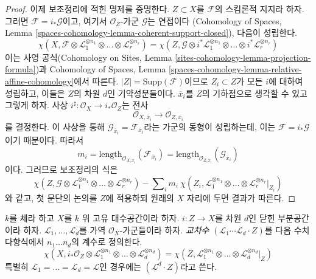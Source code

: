 \begin{proof}
\medskip\noindent
이제 보조정리에 적힌 명제를 증명한다.
$Z \subset X$를 $\mathcal{F}$의 스킴론적 지지라 하자. 그러면
$\mathcal{F} = i_*\mathcal{G}$이고, 여기서 $\mathcal{O}_Z$-가군
$\mathcal{G}$는 연접이다
(Cohomology of Spaces, Lemma
\ref{spaces-cohomology-lemma-coherent-support-closed}), 다음이 성립한다.
$$
\chi(X, \mathcal{F} \otimes
\mathcal{L}_1^{\otimes n_1} \otimes \ldots \otimes
\mathcal{L}_r^{\otimes n_r}) =
\chi(Z, \mathcal{G} \otimes
i^*\mathcal{L}_1^{\otimes n_1} \otimes \ldots \otimes
i^*\mathcal{L}_r^{\otimes n_r})
$$
이는 사영 공식(Cohomology on Sites, Lemma
\ref{sites-cohomology-lemma-projection-formula})과 Cohomology of Spaces, Lemma
\ref{spaces-cohomology-lemma-relative-affine-cohomology}에서 따른다.
$|Z| = \text{Supp}(\mathcal{F})$이므로 $Z_i \subset Z$가 모든 $i$에 대하여
성립하고, 이들은 $Z$의 차원 $d$인 기약성분들이다.
$\overline{x}_i$를 $Z$의 기하점으로 생각할 수 있고 그렇게 하자. 사상
$i^\sharp : \mathcal{O}_X \to i_*\mathcal{O}_Z$는 전사
$$
\mathcal{O}_{X, \overline{x}_i} \to \mathcal{O}_{Z, \overline{x}_i}
$$
를 결정한다. 이 사상을 통해
$\mathcal{G}_{\overline{x}_i} = \mathcal{F}_{\overline{x}_i}$라는 가군의
동형이 성립하는데, 이는 $\mathcal{F} = i_*\mathcal{G}$이기 때문이다.
따라서
$$
m_i = \text{length}_{\mathcal{O}_{X, \overline{x}_i}}
(\mathcal{F}_{\overline{x}_i}) =
\text{length}_{\mathcal{O}_{Z, \overline{x}_i}}
(\mathcal{G}_{\overline{x}_i})
$$
이다. 그러므로 보조정리의 식은
$$
\chi(Z, \mathcal{G} \otimes \mathcal{L}_1^{\otimes n_1} \otimes \ldots \otimes
\mathcal{L}_r^{\otimes n_r}) -
\sum\nolimits_i
m_i\ \chi(Z_i, \mathcal{L}_1^{\otimes n_1} \otimes \ldots \otimes
\mathcal{L}_r^{\otimes n_r}|_{Z_i})
$$
와 같고, 첫 문단의 논의를 $Z$에 적용하되 원래의 $X$ 자리에 두면 결과가
따른다.
\end{proof}

\begin{definition}
\label{definition-intersection-number}
$k$를 체라 하고 $X$를 $k$ 위 고유 대수공간이라 하자.
$i : Z \to X$를 차원 $d$인 닫힌 부분공간이라 하자.
$\mathcal{L}_1, \ldots, \mathcal{L}_d$를 가역 $\mathcal{O}_X$-가군들이라
하자. {\it 교차수}
$(\mathcal{L}_1 \cdots \mathcal{L}_d \cdot Z)$를 다음 수치 다항식에서
$n_1 \ldots n_d$의 계수로 정의한다.
$$
\chi(X, i_*\mathcal{O}_Z \otimes \mathcal{L}_1^{\otimes n_1} \otimes
\ldots \otimes \mathcal{L}_d^{\otimes n_d}) =
\chi(Z, \mathcal{L}_1^{\otimes n_1} \otimes
\ldots \otimes \mathcal{L}_d^{\otimes n_d}|_Z)
$$
특별히 $\mathcal{L}_1 = \ldots = \mathcal{L}_d = \mathcal{L}$인 경우에는
$(\mathcal{L}^d \cdot Z)$라고 쓴다.
\end{definition}

